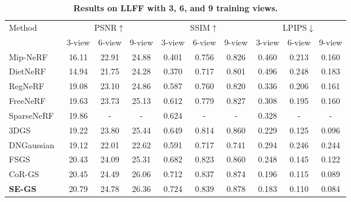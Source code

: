 \documentclass[letterpaper]{article} %
\begin{document}
\begin{table*}[!t]   
  \centering
  \begin{tabular}{@{}l|ccc|ccc|ccc}
    \toprule
     \multirow{2}{*}{Method}   & \multicolumn{3}{c|}{PSNR$\uparrow$}  & \multicolumn{3}{c|}{SSIM$\uparrow$}   & \multicolumn{3}{c}{LPIPS$\downarrow$} \\
      &  3-view & 6-view & 9-view & 3-view & 6-view & 9-view & 3-view & 6-view & 9-view \\
    \midrule
    Mip-NeRF~\cite{barron2021mip} & 16.11 & 22.91 & 24.88 & 0.401 & 0.756 & 0.826 & 0.460 & 0.213 & 0.160 \\
    DietNeRF~\cite{jain2021putting} & 14.94 & 21.75 & 24.28 & 0.370 & 0.717 & 0.801 & 0.496 & 0.248 & 0.183 \\
    RegNeRF~\cite{niemeyer2022regnerf} & 19.08 & 23.10 & 24.86 & 0.587 & 0.760 & 0.820 & 0.336 & 0.206 & 0.161 \\
    FreeNeRF~\cite{yang2023freenerf} & 19.63 & 23.73 & 25.13 & 0.612 & 0.779 & 0.827 & 0.308 & 0.195 & 0.160 \\
    SparseNeRF~\cite{wang2023sparsenerf} & 19.86 & - & - & 0.624 & - & - & 0.328 & - & - \\
    \hline
    3DGS~\cite{kerbl20233d} & 19.22 & 23.80 & \cellcolor[HTML]{FFFFD4}25.44 & 0.649 & 0.814 & \cellcolor[HTML]{FFFFD4}0.860 & \cellcolor[HTML]{FFFFD4}0.229 & \cellcolor[HTML]{FFFFD4}0.125 & \cellcolor[HTML]{FFFFD4}0.096 \\
    DNGaussian~\cite{li2024dngaussian} & 19.12 & 22.01 & 22.62 & 0.591 & 0.717 & 0.741 & 0.294 & 0.246 & 0.244 \\
    FSGS~\cite{zhu2024fsgs} & \cellcolor[HTML]{FFFFD4}20.43 & \cellcolor[HTML]{FFFFD4}24.09 & 25.31 & \cellcolor[HTML]{FFFFD4}0.682 & \cellcolor[HTML]{FFFFD4}0.823 & \cellcolor[HTML]{FFFFD4}0.860 & 0.248 & 0.145 & 0.122  \\
    CoR-GS~\cite{zhang2024cor} & \cellcolor[HTML]{FFE4CF}20.45 & \cellcolor[HTML]{FFE4CF}24.49 & \cellcolor[HTML]{FFE4CF}26.06 & \cellcolor[HTML]{FFE4CF}0.712 & \cellcolor[HTML]{FFE4CF}0.837 & \cellcolor[HTML]{FFE4CF}0.874 & \cellcolor[HTML]{FFE4CF}0.196 & \cellcolor[HTML]{FFE4CF}0.115 & \cellcolor[HTML]{FFE4CF}0.089 \\
    \textbf{SE-GS} & \cellcolor[HTML]{FFCCC9}20.79 & \cellcolor[HTML]{FFCCC9}24.78 & \cellcolor[HTML]{FFCCC9}26.36 & \cellcolor[HTML]{FFCCC9}0.724 & \cellcolor[HTML]{FFCCC9}0.839 & \cellcolor[HTML]{FFCCC9}0.878 & \cellcolor[HTML]{FFCCC9}0.183 & \cellcolor[HTML]{FFCCC9}0.110 & \cellcolor[HTML]{FFCCC9}0.084 \\
  \bottomrule
  \end{tabular}
  \caption{\textbf{Results on LLFF with 3, 6, and 9 training views.}}
  \label{tab:llff}
\end{table*}
\end{document}
